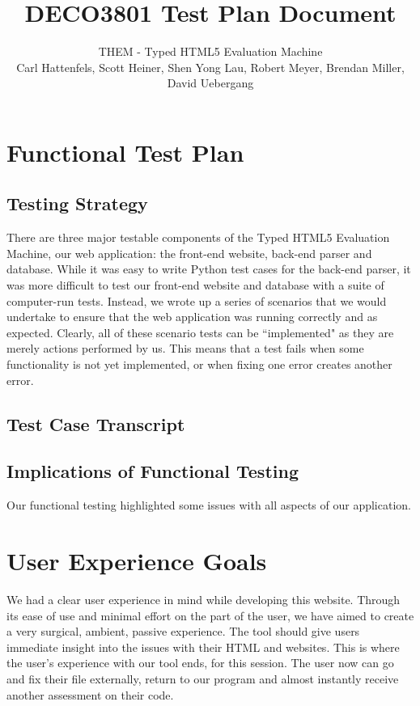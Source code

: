 \documentclass[10pt]{article}
\title{\bf DECO3801 Test Plan Document}
\author{\normalsize THEM - Typed HTML5 Evaluation Machine \\ \normalsize Carl Hattenfels, Scott Heiner, Shen Yong Lau, Robert Meyer, Brendan Miller, David Uebergang}
\date{}
\begin{document}
\maketitle

\section*{Functional Test Plan}

\subsection*{Testing Strategy}

There are three major testable components of the Typed HTML5 Evaluation Machine, our web application: the front-end website, back-end parser and database. While it was easy to write Python test cases for the back-end parser, it was more difficult to test our front-end website and database with a suite of computer-run tests. Instead, we wrote up a series of scenarios that we would undertake to ensure that the web application was running correctly and as expected. Clearly, all of these scenario tests can be ``implemented" as they are merely actions performed by us. This means that a test fails when some functionality is not yet implemented, or when fixing one error creates another error.

\subsection*{Test Case Transcript}


\subsection*{Implications of Functional Testing}

Our functional testing highlighted some issues with all aspects of our application.


\newpage

\section*{User Experience Goals}

We had a clear user experience in mind while developing this website. Through its ease of use and minimal effort on the part of the user, we have aimed to create a very surgical, ambient, passive experience. The tool should give users immediate insight into the issues with their HTML and websites. This is where the user's experience with our tool ends, for this session. The user now can go and fix their file externally, return to our program and almost instantly receive another assessment on their code.
\end{document}
